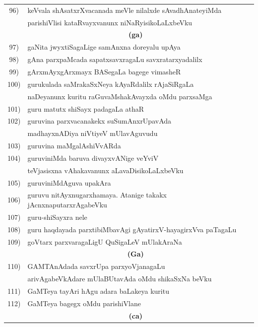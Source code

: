 {\begin{longtable}{@{}cp{7.4cm}r}
96) & keVvala shAsatxrXvacanada meVle nilalxde sAvadhAnateyiMda & \\
    & parishiVlisi kataRvayxvanunx niNaRyisikoLaLxbeVku & \pageref{page253}\\[0.3cm]
    & \multicolumn{1}{c}{\textbf{(ga)}} & \\[0.3cm]
97) & gaNita jwyxtiSagaLige samAnxna doreyalu upAya & \pageref{page51}\\
98) & gAna parxpaMcada sapatxsavxragaLu savxratarxyadalilx & \pageref{page121}\\
99) & gArxmAyxgArxmayx BASegaLa bagege vimasheR & \pageref{page6}\\
100) & gurukulada saMrakaSxNeya kAyaRdalilx rAjaSiRgaLa & \\
     & naDeyanunx kuritu raGuvaMshakAvayxda oMdu parxsaMga & \pageref{page232}\\
101) & guru matutx shiSayx padagaLa athaR & \pageref{page190}\\ 
102) & guruvina parxvacanakekx suSumAnxrUpavAda & \\
     & madhayxnADiya niVtiyeV mUlavAguvudu & \pageref{page101}\\
103) & guruvina maMgalAshiVvARda & \pageref{page75}\\
104) & guruviniMda baruva divayxvANige veYviV & \\
     & teVjasisxna vAhakavanunx aLavaDisikoLaLxbeVku & \pageref{page79}\\
105) & guruviniMdAguva upakAra & \pageref{page91}\\
106) & guruvu nitAyxnugarxhamaya. Atanige takakx jAcnxnaputarxrAgabeVku & \pageref{page74}\\
107) & guru-shiSayxra nele & \pageref{page66}\\
108) & guru haqdayada parxtibiMbavAgi gAyatirxV-hayagirxVva paTagaLu & \pageref{page76}\\
109) & goVtarx parxvaragaLigU QuSigaLeV mUlakAraNa & \pageref{page139}\\[0.3cm]
     & \multicolumn{1}{c}{\textbf{(Ga)}} & \\[0.3cm]
110) &  GAMTAnAdada savxrUpa parxyoVjanagaLu & \\
     &  arivAgabeVkAdare mUlaBUtavAda oMdu shikaSxNa beVku &  \pageref{page169}\\
111) & GaMTeya tayAri hAgu adara baLakeya kuritu & \pageref{page148}\\
112) & GaMTeya bagegx oMdu parishiVlane & \pageref{page170}\\[0.3cm]
     & \multicolumn{1}{c}{\textbf{(ca)}} & \\[0.3cm]    

\end{longtable}}
